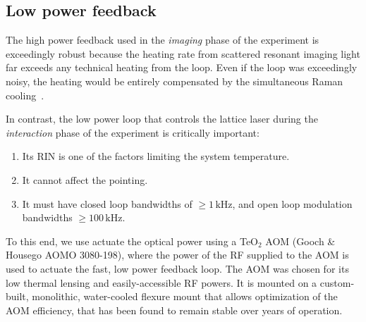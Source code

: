 \documentclass[twocolumn,aps,pra,showpacs,preprintnumbers,bibnotes]{revtex4-1}
\begin{document}
\subsection{Low power feedback}
The high power feedback used in the \textit{imaging} phase of the experiment is exceedingly robust because the heating rate from scattered resonant imaging light far exceeds any technical heating from the loop.
Even if the loop was exceedingly noisy, the heating would be entirely compensated by the simultaneous Raman cooling~\cite{Parsons2015}.

In contrast, the low power loop that controls the lattice laser during the \textit{interaction} phase of the experiment is critically important:
\begin{enumerate}
  \item Its RIN is one of the factors limiting the system temperature.
  \item It cannot affect the pointing.
  \item It must have closed loop bandwidths of $\geq1\mathrm{\,kHz}$, and open loop modulation bandwidths $\geq 100\mathrm{\,kHz}$.
\end{enumerate}
To this end, we use actuate the optical power using a TeO$_2$ AOM (Gooch \& Housego AOMO 3080-198), where the power of the RF supplied to the AOM is used to actuate the fast, low power feedback loop.
The AOM was chosen for its low thermal lensing and easily-accessible RF powers. 
It is mounted on a custom-built, monolithic, water-cooled flexure mount that allows optimization of the AOM efficiency, that has been found to remain stable over years of operation.
\end{document}
